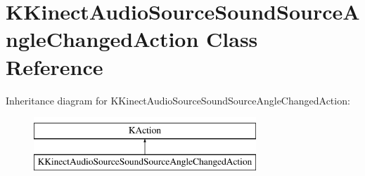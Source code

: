 \hypertarget{class_k_kinect_audio_source_sound_source_angle_changed_action}{\section{\-K\-Kinect\-Audio\-Source\-Sound\-Source\-Angle\-Changed\-Action \-Class \-Reference}
\label{class_k_kinect_audio_source_sound_source_angle_changed_action}
}
\-Inheritance diagram for \-K\-Kinect\-Audio\-Source\-Sound\-Source\-Angle\-Changed\-Action\-:\begin{figure}[H]
\begin{center}
\leavevmode
\includegraphics[height=2.000000cm]{class_k_kinect_audio_source_sound_source_angle_changed_action}
\end{center}
\end{figure}
